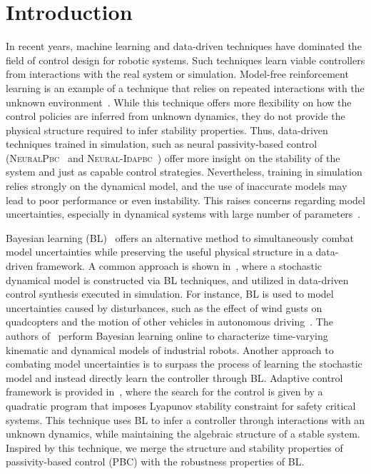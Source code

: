 \chapter{Introduction}
\label{ch:introduction}

In recent years, machine learning and data-driven techniques have dominated the
field of control design for robotic systems. 
%
Such techniques learn viable controllers from interactions with the real system
or simulation.
%
Model-free reinforcement learning is an example of a technique that relies on
repeated interactions with the unknown
environment~\cite{heess2017emergence,andrychowicz2020learning,lillicrap2015continuous}.
%
While this technique offers more flexibility on how the control policies are
inferred from unknown dynamics, they do not provide the physical structure
required to infer stability properties.
%
Thus, data-driven techniques trained in simulation, such as neural
passivity-based control (\textsc{NeuralPbc}~\cite{neuralpbc} and
\textsc{Neural-Idapbc}~\cite{neuralidapbc}) offer more insight on the stability
of the system and just as capable control strategies.
%
Nevertheless, training in simulation relies strongly on the
dynamical model, and the use of inaccurate models may lead to poor performance
or even instability.
%
This raises concerns regarding model uncertainties, especially in dynamical
systems with large number of parameters~\cite{nagy,wu2020active}.
%

Bayesian learning (BL)~\cite{gal2016improving,thakur} offers an alternative method to
simultaneously combat model uncertainties while preserving the useful physical
structure in a data-driven framework.
%
A common approach is shown in~\cite{sadigh2015safe, shen2022online,
pmlr-v54-linderman17a}, where a stochastic dynamical model is constructed via BL
techniques, and utilized in data-driven control synthesis executed in
simulation. 
%
For instance, BL is used to model uncertainties caused by disturbances, such as
the effect of wind gusts on quadcopters and the motion of other vehicles in
autonomous driving~\cite{sadigh2015safe}. 
%
The authors of~\cite{shen2022online} perform Bayesian learning online to
characterize time-varying kinematic and dynamical models of industrial robots.
%
Another approach to combating model uncertainties is to surpass the process of
learning the stochastic model and instead directly learn the controller through
BL. 
%
Adaptive control framework is provided in~\cite{fan2020bayesian}, where the
search for the control is given by a quadratic program that imposes
Lyapunov stability constraint for safety critical systems.
%
This technique uses BL to infer a controller through interactions with an
unknown dynamics, while maintaining the algebraic structure of a stable system.
%
Inspired by this technique, we merge the structure and stability properties of
passivity-based control (PBC) with the robustness properties of BL.  


